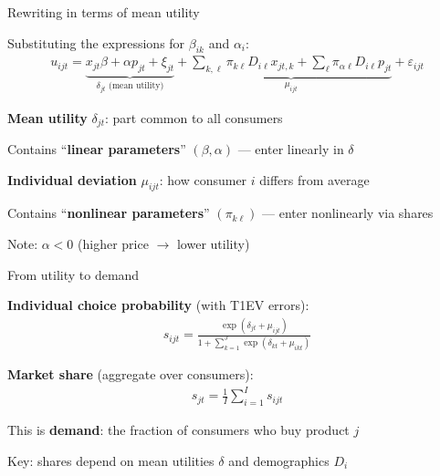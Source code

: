 \documentclass[notes,11pt, aspectratio=169]{beamer}
\newenvironment{wideitemize}{\itemize\addtolength{\itemsep}{10pt}}{\enditemize}
\begin{document}
\begin{frame}{Rewriting in terms of mean utility}
	\begin{wideitemize}
		\item Substituting the expressions for $\beta_{ik}$ and $\alpha_i$:
		\begin{align*}
			u_{ijt} = \underbrace{x_{jt} \beta + \alpha p_{jt} + \xi_{jt}}_{\delta_{jt} \text{ (mean utility)}} + \underbrace{\sum_{k,\ell} \pi_{k\ell} D_{i\ell} x_{jt,k} + \sum_{\ell} \pi_{\alpha\ell} D_{i\ell} p_{jt}}_{\mu_{ijt}} + \varepsilon_{ijt}
		\end{align*}
		\item \textbf{Mean utility} $\delta_{jt}$: part common to all consumers
		\begin{wideitemize}
			\item Contains ``\textbf{linear parameters}'' $(\beta, \alpha)$ --- enter linearly in $\delta$
		\end{wideitemize}
		\item \textbf{Individual deviation} $\mu_{ijt}$: how consumer $i$ differs from average
		\begin{wideitemize}
			\item Contains ``\textbf{nonlinear parameters}'' $(\pi_{k\ell})$ --- enter nonlinearly via shares
		\end{wideitemize}
		\item Note: $\alpha < 0$ (higher price $\rightarrow$ lower utility)
	\end{wideitemize}
\end{frame}

\begin{frame}{From utility to demand}
	\begin{wideitemize}
		\item \textbf{Individual choice probability} (with T1EV errors):
		\begin{align*}
			s_{ijt} = \frac{\exp(\delta_{jt} + \mu_{ijt})}{1 + \sum_{k=1}^J \exp(\delta_{kt} + \mu_{ikt})}
		\end{align*}
		\item \textbf{Market share} (aggregate over consumers):
		\begin{align*}
			s_{jt} = \frac{1}{I} \sum_{i=1}^{I} s_{ijt}
		\end{align*}
		\item This is \textbf{demand}: the fraction of consumers who buy product $j$
		\item Key: shares depend on mean utilities $\delta$ and demographics $D_i$
	\end{wideitemize}
\end{frame}
\end{document}
